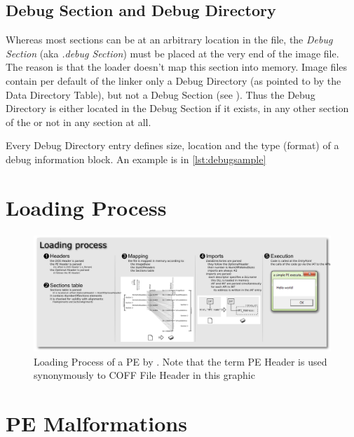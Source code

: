 \subsection*{Debug Section and Debug Directory}

Whereas most sections can be at an arbitrary location in the file, the \emph{Debug Section} (aka \emph{.debug Section}) must be placed at the very end of the image file. The reason is that the loader doesn't map this section into memory. Image files contain per default of the linker only a Debug Directory (as pointed to by the Data Directory Table), but not a Debug Section (see \cite[]{pespec}). Thus the Debug Directory is either located in the Debug Section if it exists, in any other section of the \PE{} or not in any section at all.

Every Debug Directory entry defines \ia{} size, location and the type (format) of a debug information block. An example is in \autoref{lst:debugsample}



\section{Loading Process}

\begin{figure}
\includegraphics[height=.39\textheight,keepaspectratio]{graphics/pe101}
\caption{ Loading Process of a PE by . Note that the term PE Header is used synonymously to COFF File Header in this graphic}
\label{fig:loading} 
\end{figure}


\section{PE Malformations}

